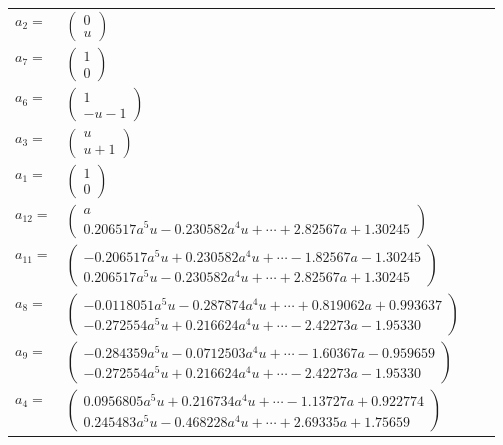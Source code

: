 \documentclass[1p]{elsarticle_modified}
\theoremstyle{definition}
\begin{document}
\begin{tabular}{m{7pt} m{180pt} m{7pt} m{180pt} }
\flushright $a_{2}=$&$\begin{pmatrix}0\\u\end{pmatrix}$ \\
\flushright $a_{7}=$&$\begin{pmatrix}1\\0\end{pmatrix}$ \\
\flushright $a_{6}=$&$\begin{pmatrix}1\\- u-1\end{pmatrix}$ \\
\flushright $a_{3}=$&$\begin{pmatrix}u\\u+1\end{pmatrix}$ \\
\flushright $a_{1}=$&$\begin{pmatrix}1\\0\end{pmatrix}$ \\
\flushright $a_{12}=$&$\begin{pmatrix}a\\0.206517 a^{5} u-0.230582 a^{4} u+\cdots+2.82567 a+1.30245\end{pmatrix}$ \\
\flushright $a_{11}=$&$\begin{pmatrix}-0.206517 a^{5} u+0.230582 a^{4} u+\cdots-1.82567 a-1.30245\\0.206517 a^{5} u-0.230582 a^{4} u+\cdots+2.82567 a+1.30245\end{pmatrix}$ \\
\flushright $a_{8}=$&$\begin{pmatrix}-0.0118051 a^{5} u-0.287874 a^{4} u+\cdots+0.819062 a+0.993637\\-0.272554 a^{5} u+0.216624 a^{4} u+\cdots-2.42273 a-1.95330\end{pmatrix}$ \\
\flushright $a_{9}=$&$\begin{pmatrix}-0.284359 a^{5} u-0.0712503 a^{4} u+\cdots-1.60367 a-0.959659\\-0.272554 a^{5} u+0.216624 a^{4} u+\cdots-2.42273 a-1.95330\end{pmatrix}$ \\
\flushright $a_{4}=$&$\begin{pmatrix}0.0956805 a^{5} u+0.216734 a^{4} u+\cdots-1.13727 a+0.922774\\0.245483 a^{5} u-0.468228 a^{4} u+\cdots+2.69335 a+1.75659\end{pmatrix}$ \\

\end{tabular}
\end{document}
